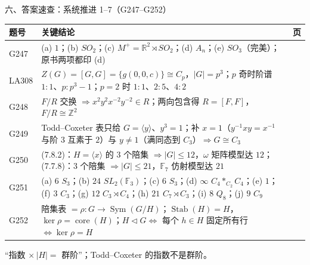 \documentclass[aspectratio=169,10pt,fontset=none]{ctexbeamer}
\begin{document}
\begin{frame}[t]{六、答案速查：系统推进 1--7（G247--G252）}
  \centering
  \scriptsize
  \setlength{\tabcolsep}{3pt}
  \renewcommand{\arraystretch}{1.12}
  \begin{tabular}{@{}l p{9.9cm} c@{}}
    \toprule
    题号 & 关键结论 & 页\\
    \midrule
    G247 & (a) $1$；(b) $SO_2$；(c) $M^+=\mathbb R^2\rtimes SO_2$；(d) $A_n$；(e) $SO_3$（完美）；原书两项都印 (d) & \pageref{ex:G247}\\
    LA308 & $Z(G)=[G,G]=\{g(0,0,c)\}\cong C_p$，$|G|=p^3$；$p$ 奇时阶谱 $1{:}1$、$p{:}p^3-1$；$p=2$ 时 $1{:}1$、$2{:}5$、$4{:}2$ & \pageref{ex:LA308}\\
    G248 & $F/R$ 交换 $\Rightarrow x^2y^2x^{-2}y^{-2}\in R$；两向包含得 $R=[F,F]$，$F/R\cong\mathbb Z^2$ & \pageref{ex:G248}\\
    G249 & Todd--Coxeter 表只给 $G=\langle y\rangle$、$y^3=1$；补 $x=1$（$y^{-1}xy=x^{-1}$ 与阶 $3$ 互素于 $2$）与 $y\ne1$（满同态到 $C_3$）$\Rightarrow G\cong C_3$ & \pageref{ex:G249}\\
    G250 & (7.8.2)：$H=\langle x\rangle$ 的 $3$ 个陪集 $\Rightarrow|G|\le12$，$\omega$ 矩阵模型达 $12$；(7.7.8)：$3$ 个陪集 $\Rightarrow|G|\le21$，$\mathbb F_7$ 仿射模型达 $21$ & \pageref{ex:G250}\\
    G251 & (a) $6$ $S_3$；(b) $24$ $SL_2(\mathbb F_3)$；(c) $6$ $S_3$；(d) $\infty$ $C_4*_{C_2}C_4$；(e) $1$；(f) $3$ $C_3$；(g) $12$ $C_3\rtimes C_4$；(h) $21$ $C_7\rtimes C_3$；(i) $8$ $Q_8$；(j) $9$ $C_9$ & \pageref{ex:G251}\\
    G252 & 陪集表 $=\rho:G\to\operatorname{Sym}(G/H)$；$\operatorname{Stab}(H)=H$，$\ker\rho=\operatorname{core}(H)$；$H\triangleleft G\iff$ 每个 $h\in H$ 固定所有行 $\iff\ker\rho=H$ & \pageref{ex:G252}\\
    \bottomrule
  \end{tabular}
  \par
  \vspace{0.3em}
  {\scriptsize\color{ink!70} “指数 $\times\,|H|=$ 群阶”；Todd--Coxeter 的指数不是群阶。}
\end{frame}
\end{document}

